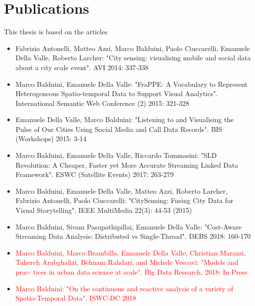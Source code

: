 \section{Publications}

This thesis is based on the articles \cite{DBLP:conf/avi/AntonelliABCVL14,DBLP:conf/semweb/BalduiniV15,DBLP:conf/bis/ValleB15,DBLP:conf/esws/BalduiniV017a,DBLP:journals/ieeemm/BalduiniVALAC15,DBLP:conf/debs/BalduiniPV18,BalduiniJBD2018,BalduiniISWC2018DC}

\begin{itemize}
\item Fabrizio Antonelli, Matteo Azzi, Marco Balduini, Paolo Ciuccarelli, Emanuele Della Valle, Roberto Larcher:
"City sensing: visualising mobile and social data about a city scale event". AVI 2014: 337-338
\item Marco Balduini, Emanuele Della Valle:
"FraPPE: A Vocabulary to Represent Heterogeneous Spatio-temporal Data to Support Visual Analytics". International Semantic Web Conference (2) 2015: 321-328
\item 	Emanuele Della Valle, Marco Balduini:
"Listening to and Visualising the Pulse of Our Cities Using Social Media and Call Data Records". BIS (Workshops) 2015: 3-14
\item 	Marco Balduini, Emanuele Della Valle, Riccardo Tommasini:
"SLD Revolution: A Cheaper, Faster yet More Accurate Streaming Linked Data Framework". ESWC (Satellite Events) 2017: 263-279
\item Marco Balduini, Emanuele Della Valle, Matteo Azzi, Roberto Larcher, Fabrizio Antonelli, Paolo Ciuccarelli:
"CitySensing: Fusing City Data for Visual Storytelling". IEEE MultiMedia 22(3): 44-53 (2015)
\item Marco Balduini, Sivam Pasupathipillai, Emanuele Della Valle:
"Cost-Aware Streaming Data Analysis: Distributed vs Single-Thread". DEBS 2018: 160-170
\item \textcolor{red}{Marco Balduini, Marco Brambilla, Emanuele Della Valle, Christian Marazzi, Tahereh Arabghalizi, Behnam Rahdari, and Michele Vescovi:
"Models and prac- tices in urban data science at scale". Big Data Research, 2018: In Press}
\item \textcolor{red}{Marco Balduini:
"On the continuous and reactive analysis of a variety of Spatio-Temporal Data". ISWC-DC 2018}
\end{itemize}